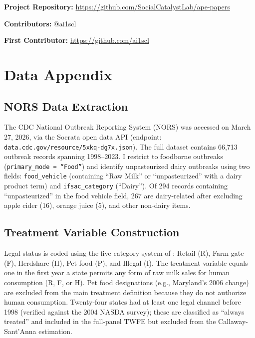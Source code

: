 \documentclass[12pt]{article}
\begin{document}
\noindent\textbf{Project Repository:} \url{https://github.com/SocialCatalystLab/ape-papers}

\noindent\textbf{Contributors:} @ai1scl

\noindent\textbf{First Contributor:} \url{https://github.com/ai1scl}

\label{apep_main_text_end}
\newpage


\newpage
\appendix

\section{Data Appendix}

\subsection{NORS Data Extraction}

The CDC National Outbreak Reporting System (NORS) was accessed on March 27, 2026, via the Socrata open data API (endpoint: \texttt{data.cdc.gov/resource/5xkq-dg7x.json}). The full dataset contains 66,713 outbreak records spanning 1998--2023. I restrict to foodborne outbreaks (\texttt{primary\_mode = ``Food''}) and identify unpasteurized dairy outbreaks using two fields: \texttt{food\_vehicle} (containing ``Raw Milk'' or ``unpasteurized'' with a dairy product term) and \texttt{ifsac\_category} (``Dairy''). Of 294 records containing ``unpasteurized'' in the food vehicle field, 267 are dairy-related after excluding apple cider (16), orange juice (5), and other non-dairy items.

\subsection{Treatment Variable Construction}

Legal status is coded using the five-category system of \citet{Whitten2022}: Retail (R), Farm-gate (F), Herdshare (H), Pet food (P), and Illegal (I). The treatment variable equals one in the first year a state permits any form of raw milk sales for human consumption (R, F, or H). Pet food designations (e.g., Maryland's 2006 change) are excluded from the main treatment definition because they do not authorize human consumption. Twenty-four states had at least one legal channel before 1998 (verified against the 2004 NASDA survey); these are classified as ``always treated'' and included in the full-panel TWFE but excluded from the Callaway-Sant'Anna estimation.
\end{document}
